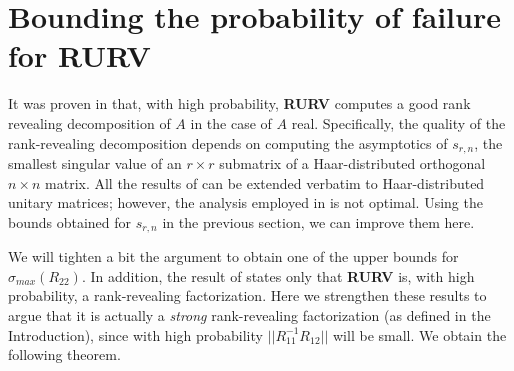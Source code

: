 \documentclass{article}
\theoremstyle{definition}
\newcommand{\smin}{s_{r,n}}
\begin{document}


\section{Bounding the probability of failure for RURV}

It was proven in \cite{DDH07} that, with high probability, \textbf{RURV} computes a good rank revealing decomposition of $A$ in the case of $A$ real. Specifically, the quality of the rank-revealing decomposition depends on computing the asymptotics of $\smin$, the smallest singular value of an $r \times r$ submatrix of a Haar-distributed orthogonal $n \times n$ matrix. All the results of \cite{DDH07} can be extended verbatim to Haar-distributed unitary matrices; however, the analysis employed in \cite{DDH07} is not optimal. Using the bounds obtained for $\smin$ in the previous section, we can improve them here. 

We will tighten a bit the argument to obtain one of the upper bounds for $\sigma_{max}(R_{22})$. In addition, the result of \cite{DDH07} states only that \textbf{RURV} is, with high probability, a rank-revealing factorization. Here we strengthen these
results to argue that it is actually a \emph{strong} rank-revealing
factorization (as defined in the Introduction), since with high probability $||R_{11}^{-1} R_{12}||$ will be small. We obtain the following theorem. 
\end{document}
